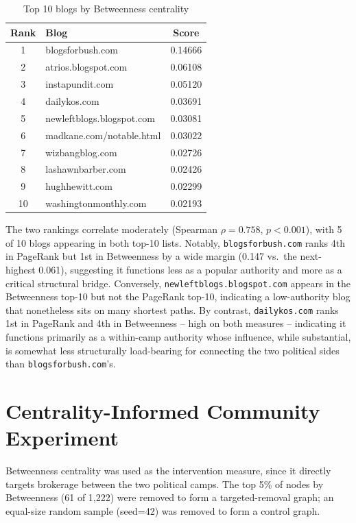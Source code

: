 \documentclass[conference]{IEEEtran}
\begin{document}
\begin{table}[htbp]
\caption{Top 10 blogs by Betweenness centrality}
\label{tab:betweenness}
\centering
\begin{tabular}{@{}clc@{}}
\toprule
Rank & Blog & Score \\
\midrule
1 & blogsforbush.com & 0.14666 \\
2 & atrios.blogspot.com & 0.06108 \\
3 & instapundit.com & 0.05120 \\
4 & dailykos.com & 0.03691 \\
5 & newleftblogs.blogspot.com & 0.03081 \\
6 & madkane.com/notable.html & 0.03022 \\
7 & wizbangblog.com & 0.02726 \\
8 & lashawnbarber.com & 0.02426 \\
9 & hughhewitt.com & 0.02299 \\
10 & washingtonmonthly.com & 0.02193 \\
\bottomrule
\end{tabular}
\end{table}

The two rankings correlate moderately (Spearman $\rho = 0.758$, $p < 0.001$), with 5 of 10 blogs appearing in both top-10 lists. Notably, \texttt{blogsforbush.com} ranks 4th in PageRank but 1st in Betweenness by a wide margin (0.147 vs.\ the next-highest 0.061), suggesting it functions less as a popular authority and more as a critical structural bridge. Conversely, \texttt{newleftblogs.blogspot.com} appears in the Betweenness top-10 but not the PageRank top-10, indicating a low-authority blog that nonetheless sits on many shortest paths. By contrast, \texttt{dailykos.com} ranks 1st in PageRank and 4th in Betweenness -- high on both measures -- indicating it functions primarily as a within-camp authority whose influence, while substantial, is somewhat less structurally load-bearing for connecting the two political sides than \texttt{blogsforbush.com}'s.

\section{Centrality-Informed Community Experiment}
Betweenness centrality was used as the intervention measure, since it directly targets brokerage between the two political camps. The top 5\% of nodes by Betweenness (61 of 1,222) were removed to form a targeted-removal graph; an equal-size random sample (seed=42) was removed to form a control graph.
\end{document}
